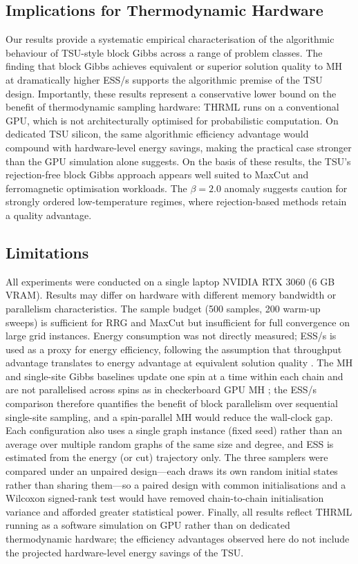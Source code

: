 \documentclass[conference]{IEEEtran}
\begin{document}
\subsection{Implications for Thermodynamic Hardware}

Our results provide a systematic empirical characterisation of the algorithmic behaviour of TSU-style block Gibbs across a range of problem classes. The finding that block Gibbs achieves equivalent or superior solution quality to MH at dramatically higher ESS/s supports the algorithmic premise of the TSU design. Importantly, these results represent a conservative lower bound on the benefit of thermodynamic sampling hardware: THRML runs on a conventional GPU, which is not architecturally optimised for probabilistic computation. On dedicated TSU silicon, the same algorithmic efficiency advantage would compound with hardware-level energy savings, making the practical case stronger than the GPU simulation alone suggests. On the basis of these results, the TSU's rejection-free block Gibbs approach appears well suited to MaxCut and ferromagnetic optimisation workloads. The $\beta = 2.0$ anomaly suggests caution for strongly ordered low-temperature regimes, where rejection-based methods retain a quality advantage.

\subsection{Limitations}

All experiments were conducted on a single laptop NVIDIA RTX 3060 (6 GB VRAM). Results may differ on hardware with different memory bandwidth or parallelism characteristics. The sample budget (500 samples, 200 warm-up sweeps) is sufficient for RRG and MaxCut but insufficient for full convergence on large grid instances. Energy consumption was not directly measured; ESS/s is used as a proxy for energy efficiency, following the assumption that throughput advantage translates to energy advantage at equivalent solution quality \cite{jelincic2025}. The MH and single-site Gibbs baselines update one spin at a time within each chain and are not parallelised across spins as in checkerboard GPU MH \cite{weigel2011}; the ESS/s comparison therefore quantifies the benefit of block parallelism over sequential single-site sampling, and a spin-parallel MH would reduce the wall-clock gap. Each configuration also uses a single graph instance (fixed seed) rather than an average over multiple random graphs of the same size and degree, and ESS is estimated from the energy (or cut) trajectory only. The three samplers were compared under an unpaired design---each draws its own random initial states rather than sharing them---so a paired design with common initialisations and a Wilcoxon signed-rank test would have removed chain-to-chain initialisation variance and afforded greater statistical power. Finally, all results reflect THRML running as a software simulation on GPU rather than on dedicated thermodynamic hardware; the efficiency advantages observed here do not include the projected hardware-level energy savings of the TSU.
\end{document}
